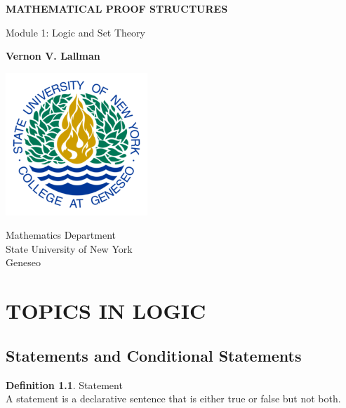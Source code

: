 \documentclass{book}
\theoremstyle{definition}
\newtheorem{definition}{Definition}[section]
\theoremstyle{remark}
\begin{document}
\begin{titlepage}
    \begin{center}
        \vspace*{1cm}
        
        \textbf{MATHEMATICAL PROOF STRUCTURES}
        
        \vspace{0.5cm}
        Module 1: Logic and Set Theory
        
        \vspace{1.5cm}
        
        \textbf{Vernon V. Lallman}
        
        \vfill
        
        
        \vspace{0.8cm}
        
        \includegraphics[width=0.4\textwidth]{university}
        
        Mathematics Department\\
        State University of New York \\
        Geneseo\\
        \date{\today}
        
    \end{center}
\end{titlepage}

\tableofcontents


\newpage
\chapter{TOPICS IN LOGIC}
\section{Statements and Conditional Statements}

\begin{definition}
Statement \\

A statement is a declarative sentence that is either true or false but not both. \\
\end{definition}
\end{document}
